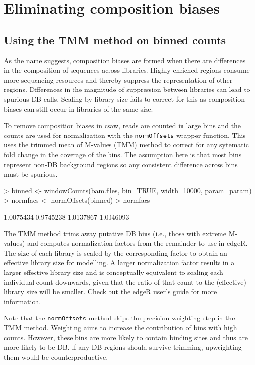 \documentclass[12pt]{report}
\renewenvironment{Schunk}{\vspace{0pt}}{\vspace{0pt}}
\newcommand{\edger}{edgeR}
\newcommand{\pkgname}{csaw}
\newcommand{\code}[1]{{\small\texttt{#1}}}
\begin{document}
\section{Eliminating composition biases}

\subsection{Using the TMM method on binned counts}
\label{sec:compo_norm}
As the name suggests, composition biases are formed when there are differences in the composition of sequences across libraries. 
Highly enriched regions consume more sequencing resources and thereby suppress the representation of other regions. 
Differences in the magnitude of suppression between libraries can lead to spurious DB calls. 
Scaling by library size fails to correct for this as composition biases can still occur in libraries of the same size. 

To remove composition biases in \pkgname{}, reads are counted in large bins and the counts are used for normalization with the \code{normOffsets} wrapper function.
This uses the trimmed mean of M-values (TMM) method \citep{oshlack2010} to correct for any sytematic fold change in the coverage of the bins. 
The assumption here is that most bins represent non-DB background regions so any consistent difference across bins must be spurious.

\begin{Schunk}
\begin{Sinput}
> binned <- windowCounts(bam.files, bin=TRUE, width=10000, param=param)
> normfacs <- normOffsets(binned)
> normfacs
\end{Sinput}
\begin{Soutput}
[1] 1.0075434 0.9745238 1.0137867 1.0046093
\end{Soutput}
\end{Schunk}

The TMM method trims away putative DB bins (i.e., those with extreme M-values) and computes normalization factors from the remainder to use in \edger{}. 
The size of each library is scaled by the corresponding factor to obtain an effective library size for modelling. 
A larger normalization factor results in a larger effective library size and is conceptually equivalent to scaling each individual count downwards, given that the ratio of that count to the (effective) library size will be smaller. 
Check out the \edger{} user's guide for more information.

Note that the \code{normOffsets} method skips the precision weighting step in the TMM method.
Weighting aims to increase the contribution of bins with high counts.
However, these bins are more likely to contain binding sites and thus are more likely to be DB. 
If any DB regions should survive trimming, upweighting them would be counterproductive. 
\end{document}
